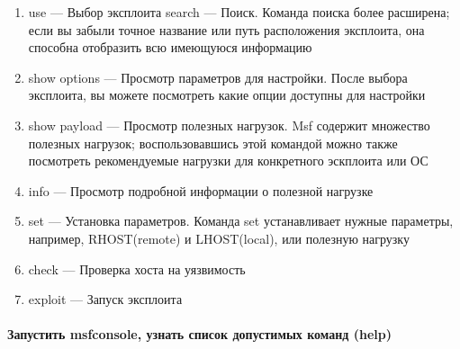 \documentclass{article}
\begin{document}
\begin{enumerate}
\item use — Выбор эксплоита
search — Поиск. Команда поиска более расширена; если вы забыли точное название или путь расположения эксплоита, она способна отобразить всю имеющуюся информацию
\item show options — Просмотр параметров для настройки. После выбора эксплоита, вы можете посмотреть какие опции доступны для настройки
\item show payload — Просмотр полезных нагрузок. Msf содержит множество полезных нагрузок; воспользовавшись этой командой можно также посмотреть рекомендуемые нагрузки для конкретного эскплоита или ОС
\item info — Просмотр подробной информации о полезной нагрузке
\item set — Установка параметров. Команда set устанавливает нужные параметры, например, RHOST(remote) и LHOST(local), или полезную нагрузку 
\item check — Проверка хоста на уязвимость
\item exploit — Запуск эксплоита
\end{enumerate}

\paragraph{Запустить msfconsole, узнать список допустимых команд (help)}
~
\end{document}
